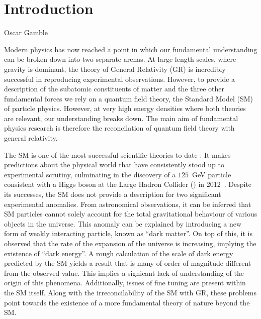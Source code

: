 \chapter{Introduction}
\label{chap:introduction}



%
{Oscar Gamble}


Modern physics has now reached a point in which our fundamental
understanding can be broken down into two separate arenas. At large
length scales, where gravity is dominant, the theory of General
Relativity (GR) is incredibly successful in reproducing experimental
observations.  However, to provide a description of the subatomic
constituents of matter and the three other fundamental forces we rely
on a quantum field theory, the Standard Model (SM) of particle
physics. However, at very high energy densities where both theories
are relevant, our understanding breaks down. The main aim of
fundamental physics research is therefore the reconcilation of quantum
field theory with general relativity.

The SM is one of the most successful scientific theories to date
\cite{Salam1964}\cite{Glashow1961}\cite{Weinberg1967}. It makes
predictions about the physical world that have consistently stood up
to experimental scrutiny, culminating in the discovery of a $125$~GeV
particle consistent with a Higgs boson at the Large Hadron Collider
(\LHC) in 2012~\cite{ATLASHiggs2012}\cite{CMS2012HiggsPaper}.  Despite
its successes, the SM does not provide a description for two
significant experimental anomalies. From astronomical observations,
it can be inferred that SM particles cannot solely account for the
total gravitational behaviour of various objects in the universe. This
anomaly can be explained by introducing a new form of weakly
interacting particle, known as ``dark matter''. On top of this, it is
observed that the rate of the expansion of the universe is increasing,
implying the existence of ``dark energy''. A rough calculation of the
scale of dark energy predicted by the SM yields a result that is many
of order of magnitude different from the observed value. This implies
a signicant lack of understanding of the origin of this phenomena.
Additionally, issues of fine tuning are present within the SM itself.
Along with the irreconcilability of the SM with GR, these problems
point towards the existence of a more fundamental theory of nature
beyond the SM.

